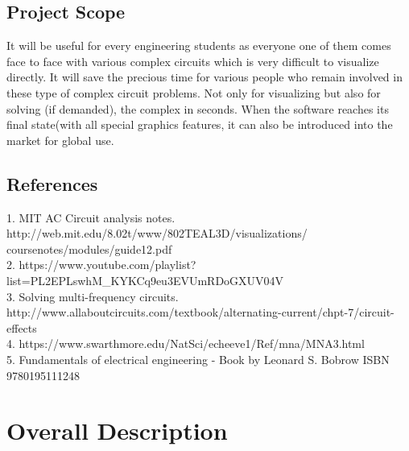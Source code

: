 \documentclass{scrreprt}
\begin{document}
\section{Project Scope}
$ $It will be useful for every engineering students as everyone one of them comes face to face with various complex circuits which is very difficult to visualize directly. It will save the precious time for various people who remain involved in these type of complex circuit problems. Not only for visualizing but also for solving (if demanded), the complex in seconds. When the software reaches its final state(with all special graphics features, it can also be introduced into the market for global use.$ $

\section{References}
$ $
\\
1. MIT AC Circuit analysis notes. http://web.mit.edu/8.02t/www/802TEAL3D/visualizations/
coursenotes/modules/guide12.pdf \\
2. https://www.youtube.com/playlist?list=PL2EPLswhM_KYKCq9eu3EVUmRDoGXUV04V \\
3. Solving multi-frequency circuits. http://www.allaboutcircuits.com/textbook/alternating-current/chpt-7/circuit-effects \\
4. https://www.swarthmore.edu/NatSci/echeeve1/Ref/mna/MNA3.html \\
5. Fundamentals of electrical engineering - Book by Leonard S. Bobrow ISBN 9780195111248 \\
$ $


\chapter{Overall Description}
$ $
\\
\\
$ $
\end{document}
